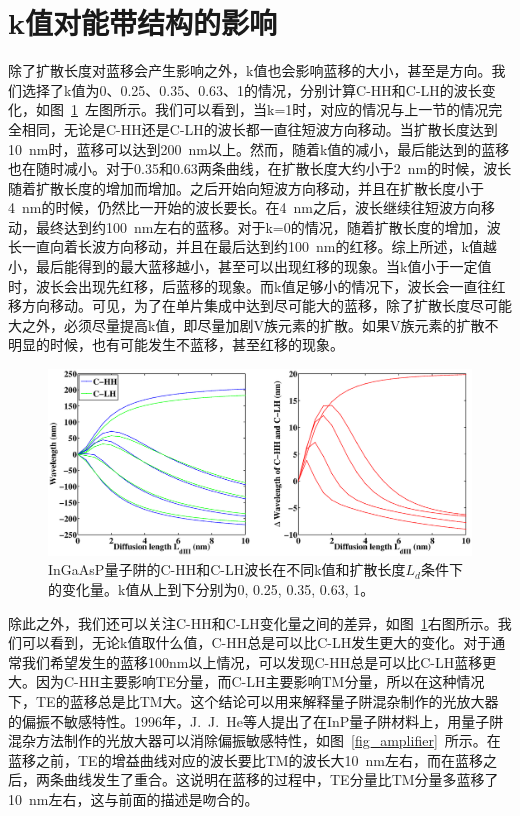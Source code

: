 \documentclass{ZJUthesis}
\begin{document}
\section{k值对能带结构的影响}

除了扩散长度对蓝移会产生影响之外，k值也会影响蓝移的大小，甚至是方向。我们选择了k值为0、0.25、0.35、0.63、1的情况，分别计算C-HH和C-LH的波长变化，如图~\ref{fig_k}~左图所示。我们可以看到，当k=1时，对应的情况与上一节的情况完全相同，无论是C-HH还是C-LH的波长都一直往短波方向移动。当扩散长度达到10~nm时，蓝移可以达到200~nm以上。然而，随着k值的减小，最后能达到的蓝移也在随时减小。对于0.35和0.63两条曲线，在扩散长度大约小于2~nm的时候，波长随着扩散长度的增加而增加。之后开始向短波方向移动，并且在扩散长度小于4~nm的时候，仍然比一开始的波长要长。在4~nm之后，波长继续往短波方向移动，最终达到约100~nm左右的蓝移。对于k=0的情况，随着扩散长度的增加，波长一直向着长波方向移动，并且在最后达到约100~nm的红移。综上所述，k值越小，最后能得到的最大蓝移越小，甚至可以出现红移的现象。当k值小于一定值时，波长会出现先红移，后蓝移的现象。而k值足够小的情况下，波长会一直往红移方向移动。可见，为了在单片集成中达到尽可能大的蓝移，除了扩散长度尽可能大之外，必须尽量提高k值，即尽量加剧V族元素的扩散。如果V族元素的扩散不明显的时候，也有可能发生不蓝移，甚至红移的现象。

\begin{figure}[htbp]
    \centering
    \includegraphics[width=1.0\textwidth]{./Pictures/k.eps}
    \caption{InGaAsP量子阱的C-HH和C-LH波长在不同k值和扩散长度$L_d$条件下的变化量。k值从上到下分别为0, 0.25, 0.35, 0.63, 1。}
    \label{fig_k}
\end{figure}

除此之外，我们还可以关注C-HH和C-LH变化量之间的差异，如图~\ref{fig_k}右图所示。我们可以看到，无论k值取什么值，C-HH总是可以比C-LH发生更大的变化。对于通常我们希望发生的蓝移100nm以上情况，可以发现C-HH总是可以比C-LH蓝移更大。因为C-HH主要影响TE分量，而C-LH主要影响TM分量，所以在这种情况下，TE的蓝移总是比TM大。这个结论可以用来解释量子阱混杂制作的光放大器的偏振不敏感特性。1996年，J.~J.~He等人提出了在InP量子阱材料上，用量子阱混杂方法制作的光放大器可以消除偏振敏感特性\cite{J1996Polarization}，如图~\ref{fig_amplifier}~所示。在蓝移之前，TE的增益曲线对应的波长要比TM的波长大10~nm左右，而在蓝移之后，两条曲线发生了重合。这说明在蓝移的过程中，TE分量比TM分量多蓝移了10~nm左右，这与前面的描述是吻合的。
\end{document}
